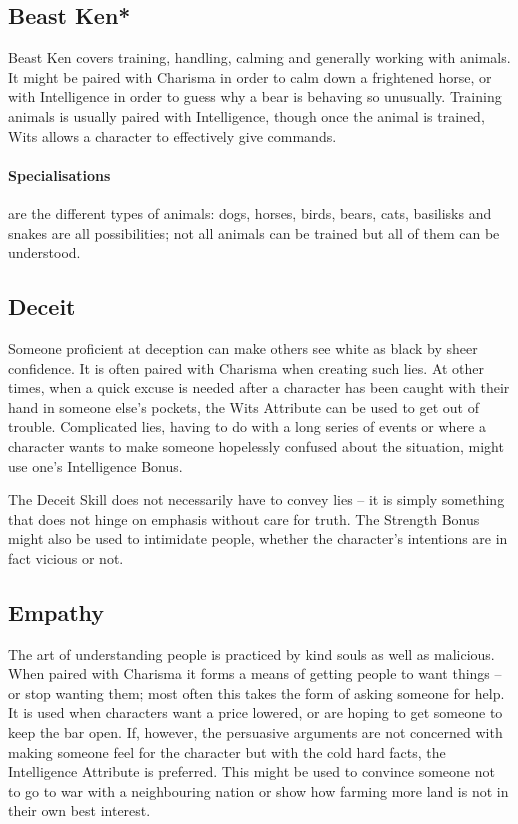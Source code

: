 \documentclass[titlepage,a4paper,openany]{book}
\begin{document}
\begin{multicols}{2}
\subsection{Beast Ken*}

Beast Ken covers training, handling, calming and generally working with animals. It might be paired with Charisma in order to calm down a frightened horse, or with Intelligence in order to guess why a bear is behaving so unusually. Training animals is usually paired with Intelligence, though once the animal is trained, Wits allows a character to effectively give commands.

\paragraph{Specialisations} are the different types of animals: dogs, horses, birds, bears, cats, basilisks and snakes are all possibilities; not all animals can be trained but all of them can be understood.

\subsection{Deceit}

Someone proficient at deception can make others see white as black by sheer confidence. It is often paired with Charisma when creating such lies. At other times, when a quick excuse is needed after a character has been caught with their hand in someone else's pockets, the Wits Attribute can be used to get out of trouble. Complicated lies, having to do with a long series of events or where a character wants to make someone hopelessly confused about the situation, might use one's Intelligence Bonus.

The Deceit Skill does not necessarily have to convey lies -- it is simply something that does not hinge on emphasis without care for truth. The Strength Bonus might also be used to intimidate people, whether the character's intentions are in fact vicious or not.

\subsection{Empathy}

The art of understanding people is practiced by kind souls as well as malicious. When paired with Charisma it forms a means of getting people to want things -- or stop wanting them; most often this takes the form of asking someone for help. It is used when characters want a price lowered, or are hoping to get someone to keep the bar open. If, however, the persuasive arguments are not concerned with making someone feel for the character but with the cold hard facts, the Intelligence Attribute is preferred. This might be used to convince someone not to go to war with a neighbouring nation or show how farming more land is not in their own best interest.


\end{multicols}
\end{document}
